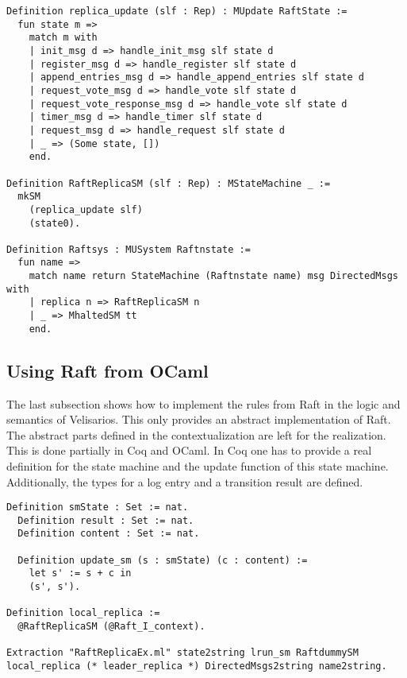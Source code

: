 \begin{lstlisting}[style=coq,label=lst:update,
caption=Shows the matching of messages to the appropriate update functions and
the creation of a process as well as the matching between a node and its process.]
Definition replica_update (slf : Rep) : MUpdate RaftState :=
  fun state m =>
    match m with
    | init_msg d => handle_init_msg slf state d
    | register_msg d => handle_register slf state d
    | append_entries_msg d => handle_append_entries slf state d
    | request_vote_msg d => handle_vote slf state d
    | request_vote_response_msg d => handle_vote slf state d
    | timer_msg d => handle_timer slf state d
    | request_msg d => handle_request slf state d
    | _ => (Some state, [])
    end.

Definition RaftReplicaSM (slf : Rep) : MStateMachine _ :=
  mkSM
    (replica_update slf)
    (state0).

Definition Raftsys : MUSystem Raftnstate :=
  fun name =>
    match name return StateMachine (Raftnstate name) msg DirectedMsgs with
    | replica n => RaftReplicaSM n
    | _ => MhaltedSM tt
    end.
\end{lstlisting}

\subsection{Using Raft from OCaml}
The last subsection shows how to implement the rules
from Raft in the logic and semantics of Velisarios.
This only provides an abstract implementation of
Raft. The abstract parts defined in the contextualization
are left for the realization. This is done partially
in Coq and OCaml. In Coq one has to provide a real
definition for the state machine and the update function
of this state machine. Additionally, the types for
a log entry and a transition result are defined.

\begin{lstlisting}[style=coq,label=lst:example,
caption=The definitions on how a node changes it node state.]
  Definition smState : Set := nat.
  Definition result : Set := nat.
  Definition content : Set := nat.

  Definition update_sm (s : smState) (c : content) :=
    let s' := s + c in
    (s', s').

Definition local_replica :=
  @RaftReplicaSM (@Raft_I_context).

Extraction "RaftReplicaEx.ml" state2string lrun_sm RaftdummySM local_replica (* leader_replica *) DirectedMsgs2string name2string.
\end{lstlisting}

